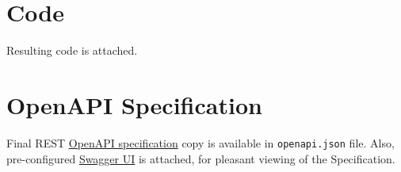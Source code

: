 \chapter{Code}
Resulting code is attached.

\chapter{OpenAPI Specification} \label{ape:documentation}
Final REST \hyperref[sec:openapi]{OpenAPI specification} copy is available in \texttt{openapi.json} file.
Also, pre-configured \hyperref[sec:swagger]{Swagger UI} is attached, for pleasant viewing of the Specification.
